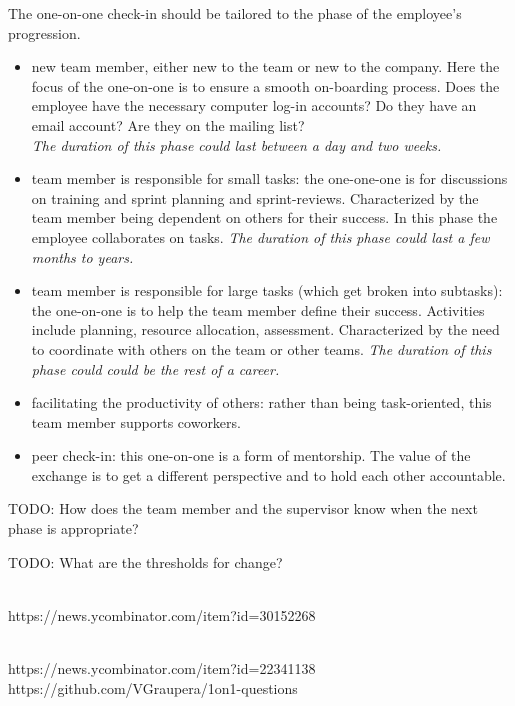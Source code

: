 The one-on-one check-in should be tailored to the phase of the employee's progression. 
\begin{itemize}
    \item new team member, either new to the team or new to the company. Here the focus of the one-on-one is to ensure a smooth on-boarding process. Does the employee have the necessary computer log-in accounts? Do they have an email account? Are they on the mailing list?\\
\textit{The duration of this phase could last between a day and two weeks.}
    \item team member is responsible for small tasks: the one-one-one is for discussions on training and sprint planning and sprint-reviews. Characterized by the team member being dependent on others for their success. In this phase the employee collaborates on tasks.
\textit{The duration of this phase could last a few months to years.}
    \item team member is responsible for large tasks (which get broken into subtasks): the one-on-one is to help the team member define their success. Activities include planning, resource allocation, assessment. Characterized by the need to coordinate with others on the team or other teams.
\textit{The duration of this phase could could be the rest of a career.}
    \item facilitating the productivity of others: rather than being task-oriented, this team member supports coworkers. 
    \item peer check-in: this one-on-one is a form of mentorship. The value of the exchange is to get a different perspective and to hold each other accountable.
\end{itemize}

TODO: How does the team member and the supervisor know when the next phase is appropriate?

TODO: What are the thresholds for change?

\ \\

https://news.ycombinator.com/item?id=30152268

\ \\

https://news.ycombinator.com/item?id=22341138
https://github.com/VGraupera/1on1-questions

